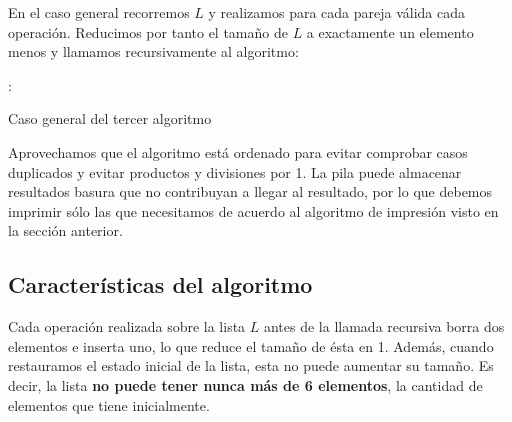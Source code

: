 En el caso general recorremos $L$ y realizamos para cada pareja válida cada operación.
Reducimos por tanto el tamaño de $L$ a exactamente un elemento menos y llamamos
recursivamente al algoritmo:


\begin{algo}
: \\
\caption{Caso general del tercer algoritmo}
\end{algo}

Aprovechamos que el algoritmo está ordenado para evitar comprobar
casos duplicados y evitar productos y divisiones por 1.
La pila puede almacenar resultados basura que no contribuyan a
llegar al resultado, por lo que debemos imprimir sólo las que
necesitamos de acuerdo al algoritmo de impresión visto en la
sección anterior.

\subsection{Características del algoritmo}

Cada operación realizada sobre la lista $L$ antes de la llamada
recursiva borra dos elementos e inserta uno, lo que reduce el
tamaño de ésta en 1. Además, cuando restauramos el estado inicial
de la lista, esta no puede aumentar su tamaño. Es decir, la lista
\textbf{no puede tener nunca más de 6 elementos}, la cantidad
de elementos que tiene inicialmente.

